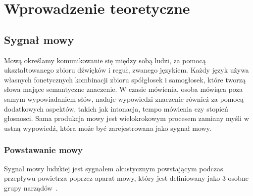 \documentclass[a4paper,12 pt]{report}
\begin{document}
\chapter{Wprowadzenie teoretyczne}

\section{Sygnał mowy}
Mową określamy komunikowanie się między sobą ludzi, za pomocą ukształtowanego zbioru dźwięków i reguł, zwanego językiem. Każdy język używa własnych fonetycznych kombinacji zbioru spółgłosek i samogłosek, które tworzą słowa mające semantyczne znaczenie. W czasie mówienia, osoba mówiąca poza samym wypowiadaniem słów, nadaje wypowiedzi znaczenie również za pomocą dodatkowych aspektów, takich jak intonacja, tempo mówienia czy stopień głosnosci.
Sama produkcja mowy jest wielokrokowym procesem zamiany myśli w ustną wypowiedź, która może być zarejestrowana jako sygnał mowy.


 
\subsection{Powstawanie mowy}

Sygnal mowy ludzkiej jest sygnałem akustycznym powstającym podczas przepływu powietrza poprzez aparat mowy, który jest definiowany jako 3 osobne grupy narządów~\cite{speech}.
\end{document}
